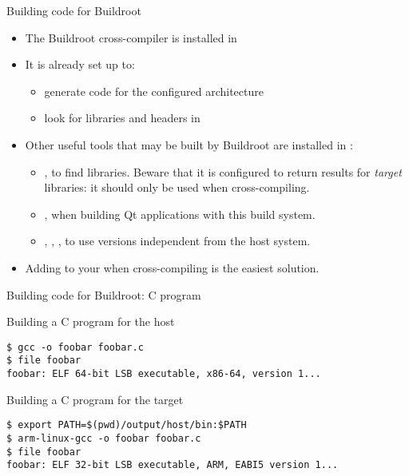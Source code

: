 \begin{frame}{Building code for Buildroot}
  \begin{itemize}
  \item The Buildroot cross-compiler is installed in
  \item It is already set up to:
    \begin{itemize}
    \item generate code for the configured architecture
    \item look for libraries and headers in 
    \end{itemize}
  \item Other useful tools that may be built by Buildroot are
    installed in :
    \begin{itemize}
    \item {}, to find libraries. Beware that it is
      configured to return results for {\em target} libraries: it
      should only be used when cross-compiling.
    \item {}, when building Qt applications with this build
      system.
    \item {}, , , to use
      versions independent from the host system.
    \end{itemize}
  \item Adding  to your  when
    cross-compiling is the easiest solution.
  \end{itemize}
\end{frame}

\begin{frame}[fragile]{Building code for Buildroot: C program}

\begin{block}{Building a C program for the host}
{\small
  \begin{verbatim}
$ gcc -o foobar foobar.c
$ file foobar
foobar: ELF 64-bit LSB executable, x86-64, version 1...
\end{verbatim}}
\end{block}

\begin{block}{Building a C program for the target}
{\small
  \begin{verbatim}
$ export PATH=$(pwd)/output/host/bin:$PATH
$ arm-linux-gcc -o foobar foobar.c
$ file foobar
foobar: ELF 32-bit LSB executable, ARM, EABI5 version 1...
\end{verbatim}}
\end{block}

\end{frame}

